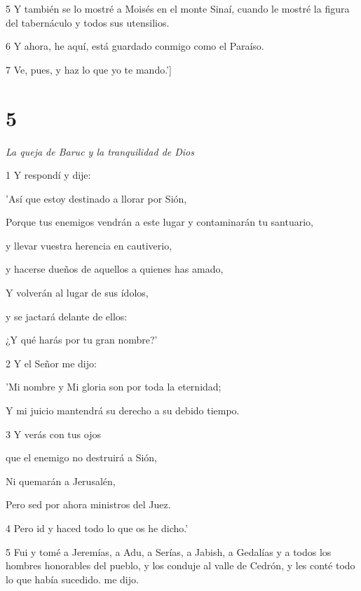 \par 5 Y también se lo mostré a Moisés en el monte Sinaí, cuando le mostré la figura del tabernáculo y todos sus utensilios.

\par 6 Y ahora, he aquí, está guardado conmigo como el Paraíso.

\par 7 Ve, pues, y haz lo que yo te mando.']

\chapter{5}

\par \textit{La queja de Baruc y la tranquilidad de Dios}

\par 1 Y respondí y dije:

\par 'Así que estoy destinado a llorar por Sión,

Porque tus enemigos vendrán a este lugar y contaminarán tu santuario,

y llevar vuestra herencia en cautiverio,

\par y hacerse dueños de aquellos a quienes has amado,

Y volverán al lugar de sus ídolos,

\par y se jactará delante de ellos:

\par ¿Y qué harás por tu gran nombre?'

\par 2 Y el Señor me dijo:

\par 'Mi nombre y Mi gloria son por toda la eternidad;

Y mi juicio mantendrá su derecho a su debido tiempo.

\par 3 Y verás con tus ojos

\par que el enemigo no destruirá a Sión,

Ni quemarán a Jerusalén,

\par Pero sed por ahora ministros del Juez.

\par 4 Pero id y haced todo lo que os he dicho.'


\par 5 Fui y tomé a Jeremías, a Adu, a Serías, a Jabish, a Gedalías y a todos los hombres honorables del pueblo, y los conduje al valle de Cedrón, y les conté todo lo que había sucedido. me dijo.

